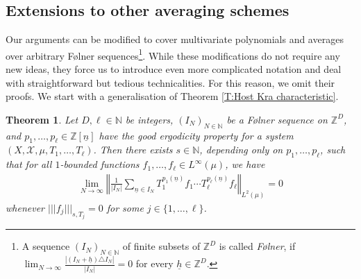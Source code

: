 \documentclass[11pt]{amsart}
\newtheorem{theorem}[lemma]{Theorem}
\theoremstyle{definition}
\newcommand{\N}{{\mathbb N}}
\newcommand{\Z}{{\mathbb Z}}
\newcommand{\CX}{{\mathcal X}}
\newcommand{\uh}{{\underline{h}}}
\newcommand{\un}{{\underline{n}}}
\newcommand{\norm}[1]{\left\Vert #1\right\Vert}
\newcommand{\nnorm}[1]{\lvert\!|\!| #1|\!|\!\rvert}
\begin{document}
\subsection{Extensions to other averaging schemes}
 Our arguments can be modified  to cover multivariate polynomials and averages over arbitrary F\o lner sequences\footnote{A sequence $(I_N)_{N\in\N}$ of finite subsets of $\Z^D$  is called {\em F\o lner}, if $\lim_{N\to\infty}\frac{|(I_N+\uh)\triangle I_N|}{|I_N|}=0$ for every $\uh\in\Z^D$.}.  While these modifications do not require any new ideas, they force us to introduce even more complicated notation and deal with straightforward but tedious technicalities. For this reason, we omit their proofs. We start with a generalisation of Theorem \ref{T:Host Kra characteristic}.
\begin{theorem}\label{T:Host Kra characteristic Folner}
    Let $D, \ell\in\N$ be integers, $(I_N)_{N\in\N}$ be a F\o lner sequence on $\Z^D$, and  $p_1, \ldots, p_\ell\in \Z[\un]$ have  the good ergodicity property for a system  $(X,\CX, \mu,T_1, \ldots, T_\ell)$. Then there exists $s\in\N$, depending only on $p_1, \ldots, p_\ell$, such that for all $1$-bounded functions $f_1, \ldots, f_\ell\in L^\infty(\mu)$, we have
\begin{align*}
        \lim_{N\to\infty}\norm{\frac{1}{|I_N|}\sum_{\un\in I_N} T_1^{p_1(\un)}f_1 \cdots T_\ell^{p_\ell(\un)}f_\ell}_{L^2(\mu)} = 0
\end{align*}
    whenever $\nnorm{f_j}_{s, T_j} = 0$ for some $j\in\{1, \ldots, \ell\}$.
\end{theorem}
\end{document}
